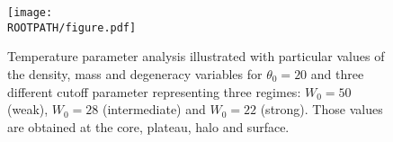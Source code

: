 \begin{figure}%
	\centering%
	\texttt{[image: \\ROOTPATH/figure.pdf]}
	\caption{Temperature parameter analysis illustrated with particular values of the density, mass and degeneracy variables for $\theta_0 = 20$ and three different cutoff parameter representing three regimes: $W_0 = 50$ (weak), $W_0 = 28$ (intermediate) and $W_0 = 22$ (strong). Those values are obtained at the core, plateau, halo and surface.}%
	\label{fig:analysis:with-cutoff:beta0:core}%
\end{figure}